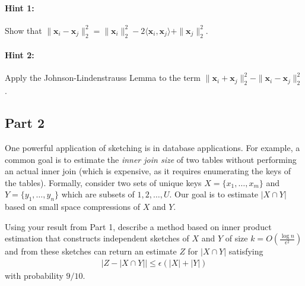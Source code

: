 \documentclass{article}
\begin{document}
\paragraph{Hint 1:} Show that $\| \mathbf{x}_i - \mathbf{x}_j \|_2^2 = \| \mathbf{x}_i \|_2^2 - 2 \langle \mathbf{x}_i, \mathbf{x}_j \rangle + \| \mathbf{x}_j \|_2^2$.

\paragraph{Hint 2:} Apply the Johnson-Lindenstrauss Lemma to the term $\| \mathbf{x}_i + \mathbf{x}_j \|_2^2 - \| \mathbf{x}_i - \mathbf{x}_j \|_2^2$.

\subsection*{Part 2}
One powerful application of sketching is in database applications. For example, a common goal is to estimate the \emph{inner join size} of two tables without performing an actual inner join (which is expensive, as it requires enumerating the keys of the tables).
Formally, consider two sets of unique keys $X = \{x_1, \ldots, x_m\}$ and $Y = \{y_1, \ldots, y_n\}$ which are subsets of $1,2, \ldots, U$. 
Our goal is to estimate $|X\cap Y|$ based on small space compressions of $X$ and $Y$.  

Using your result from Part 1, describe a method based on inner product estimation that constructs independent sketches of $X$ and $Y$ of size  $k = O\left(\frac{\log n}{\epsilon^2}\right)$ and from these sketches can return an estimate $Z$ for $|X\cap Y|$ satisfying
\begin{align*}
	\left|Z - |X\cap Y|\right| \leq \epsilon (|X|+|Y|)
\end{align*}
with probability $9/10$.

%
\end{document}
